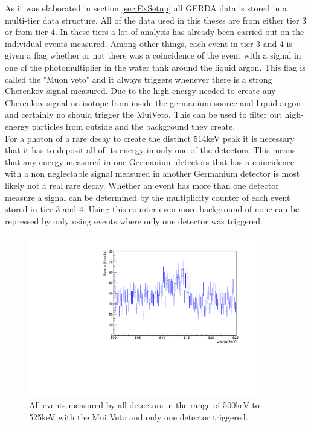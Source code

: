 As it was elaborated in section \ref{sec:ExSetup} all GERDA data is stored in a multi-tier data structure. 
All of the data used in this theses are from either tier 3 or from tier 4.
In these tiers a lot of analysis has already been carried out on the individual events measured. 
Among other things, each event in tier 3 and 4 is given a flag whether or not there was a coincidence of the event with a signal in one of the photomultiplier in the water tank around the liquid argon.
This flag is called the "Muon veto" and it always triggers whenever there is a strong Cherenkov signal measured.
Due to the high energy needed to create any Cherenkov signal no isotope from inside the germanium source and liquid argon and certainly no  should trigger the MuiVeto.
This can be used to filter out high-energy particles from outside and the background they create.
\\

For a photon of a rare  decay to create the distinct 514keV peak it is necessary that it has to deposit all of its energy in only one of the detectors. 
This means that any energy measured in one Germanium detectors that has a coincidence with a non neglectable signal measured in another Germanium detector is most likely not a real rare  decay.
Whether an event has more than one detector measure a signal can be determined by the multiplicity counter of each event stored in tier 3 and 4.
Using this counter even more background of none  can be repressed by only using events where only one detector was triggered.
\\

\begin{figure}[t!]
	\centering
	\ifmakefigures%
	\includegraphics[width=100mm]{./Bilder/500525NoFilterAllDetectors.pdf}
	\fi%
	\caption{\label{fig:leichtGefiltertes500525}
		All events measured by all detectors in the range of 500keV to 525keV with the Mui Veto and only one detector triggered.
	}
\end{figure}

